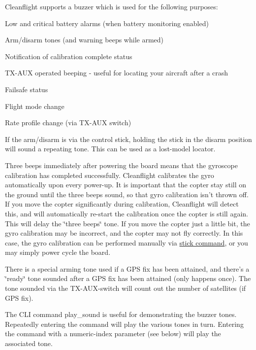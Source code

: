 Cleanflight supports a buzzer which is used for the following purposes\+:


\begin{DoxyItemize}
\item Low and critical battery alarms (when battery monitoring enabled)
\item Arm/disarm tones (and warning beeps while armed)
\item Notification of calibration complete status
\item T\+X-\/\+A\+U\+X operated beeping -\/ useful for locating your aircraft after a crash
\item Failsafe status
\item Flight mode change
\item Rate profile change (via T\+X-\/\+A\+U\+X switch)
\end{DoxyItemize}

If the arm/disarm is via the control stick, holding the stick in the disarm position will sound a repeating tone. This can be used as a lost-\/model locator.

Three beeps immediately after powering the board means that the gyroscope calibration has completed successfully. Cleanflight calibrates the gyro automatically upon every power-\/up. It is important that the copter stay still on the ground until the three beeps sound, so that gyro calibration isn't thrown off. If you move the copter significantly during calibration, Cleanflight will detect this, and will automatically re-\/start the calibration once the copter is still again. This will delay the \char`\"{}three beeps\char`\"{} tone. If you move the copter just a little bit, the gyro calibration may be incorrect, and the copter may not fly correctly. In this case, the gyro calibration can be performed manually via \hyperlink{Controls_8md}{stick command}, or you may simply power cycle the board.

There is a special arming tone used if a G\+P\+S fix has been attained, and there's a \char`\"{}ready\char`\"{} tone sounded after a G\+P\+S fix has been attained (only happens once). The tone sounded via the T\+X-\/\+A\+U\+X-\/switch will count out the number of satellites (if G\+P\+S fix).

The C\+L\+I command {\ttfamily play\+\_\+sound} is useful for demonstrating the buzzer tones. Repeatedly entering the command will play the various tones in turn. Entering the command with a numeric-\/index parameter (see below) will play the associated tone.

